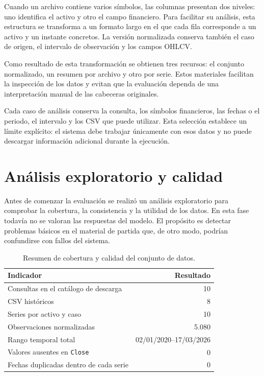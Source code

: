 Cuando un archivo contiene varios símbolos, las columnas presentan dos niveles: uno identifica el activo y otro el campo financiero. Para facilitar su análisis, esta estructura se transforma a un formato largo en el que cada fila corresponde a un activo y un instante concretos. La versión normalizada conserva también el caso de origen, el intervalo de observación y los campos OHLCV.

Como resultado de esta transformación se obtienen tres recursos: el conjunto normalizado, un resumen por archivo y otro por serie. Estos materiales facilitan la inspección de los datos y evitan que la evaluación dependa de una interpretación manual de las cabeceras originales.

Cada caso de análisis conserva la consulta, los símbolos financieros, las fechas o el periodo, el intervalo y los CSV que puede utilizar. Esta selección establece un límite explícito: el sistema debe trabajar únicamente con esos datos y no puede descargar información adicional durante la ejecución.

\section{Análisis exploratorio y calidad}

Antes de comenzar la evaluación se realizó un análisis exploratorio para comprobar la cobertura, la consistencia y la utilidad de los datos. En esta fase todavía no se valoran las respuestas del modelo. El propósito es detectar problemas básicos en el material de partida que, de otro modo, podrían confundirse con fallos del sistema.

\begin{table}[htbp]
\centering
\small
\begin{tabular}{lr}
\toprule
\textbf{Indicador} & \textbf{Resultado} \\
\midrule
Consultas en el catálogo de descarga & 10 \\
CSV históricos & 8 \\
Series por activo y caso & 10 \\
Observaciones normalizadas & 5.080 \\
Rango temporal total & 02/01/2020--17/03/2026 \\
Valores ausentes en \texttt{Close} & 0 \\
Fechas duplicadas dentro de cada serie & 0 \\
\bottomrule
\end{tabular}
\caption{Resumen de cobertura y calidad del conjunto de datos.}
\label{tab:calidad_datos}
\end{table}

